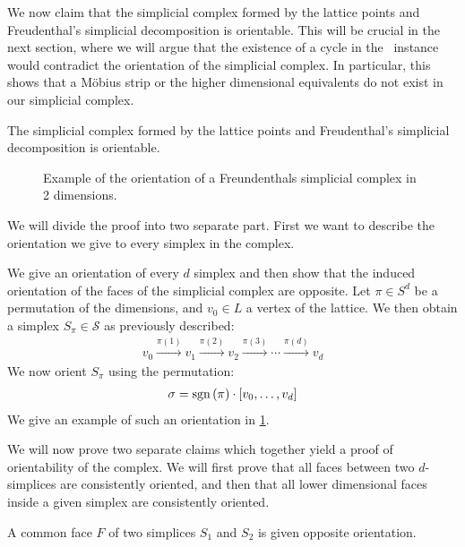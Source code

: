 We now claim that the simplicial complex formed by the lattice points and Freudenthal's simplicial decomposition is orientable. This will be crucial in the next section, where we will argue that the existence of a cycle in the \EndOfLine\ instance would contradict the orientation of the simplicial complex. In particular, this shows that a Möbius strip or the higher dimensional equivalents do not exist in our simplicial complex.

\begin{proposition}\label{prop:orientability_freudenthal}
	The simplicial complex formed by the lattice points and Freudenthal's simplicial decomposition is orientable.
\end{proposition}

\begin{figure}[ht]
	\centering
	\caption[Orientation of a simplicial complex]{Example of the orientation of a Freundenthals simplicial complex in 2 dimensions.}\label{fig:orientation_of_simplicial_complex}
\end{figure}

We will divide the proof into two separate part. First we want to describe the orientation we give to every simplex in the complex.

We give an orientation of every $d$ simplex and then show that the induced orientation of the faces of the simplicial complex are opposite.
Let $\pi \in S^d$ be a permutation of the dimensions, and $v_0 \in L$ a vertex of the lattice. We then obtain a simplex $S_{\pi} \in \mathcal{S}$ as previously described:
\begin{align*}
	v_0 \xrightarrow{\pi(1)} v_1 \xrightarrow{\pi(2)} v_2 \xrightarrow{\pi(3)} \cdots \xrightarrow{\pi(d)} v_d
\end{align*}
We now orient $S_{\pi}$ using the permutation:
\begin{align*}
	\sigma = \operatorname{sgn}\left(\pi\right) \cdot [v_0, \dots, v_d]
\end{align*}
We give an example of such an orientation in \cref{fig:orientation_of_simplicial_complex}.

We will now prove two separate claims which together yield a proof of orientability of the complex. We will first prove that all faces between two $d$-simplices are consistently oriented, and then that all lower dimensional faces inside a given simplex are consistently oriented.

\begin{lemma}\label{lem:orientation_faces_between_simplices}
	A common face $F$ of two simplices $S_1$ and $S_2$ is given opposite orientation.
\end{lemma}


